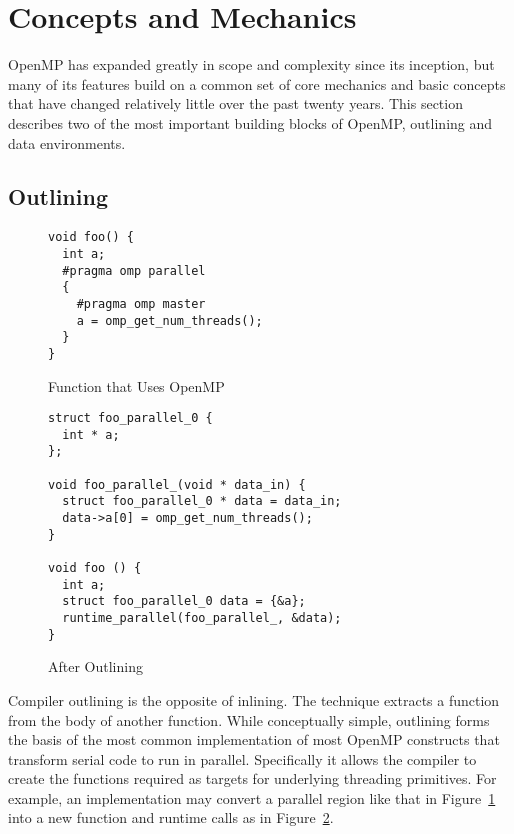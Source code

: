 \section{Concepts and Mechanics}
\label{sec:concepts}

OpenMP has expanded greatly in scope and complexity since its inception, but
many of its features build on a common set of core mechanics and basic concepts
that have changed relatively little over the past twenty years.  This section
describes two of the most important building blocks of OpenMP, outlining and
data environments.

\subsection{Outlining}
\label{sub:outlining}

\begin{figure}
\begin{verbatim}
void foo() {
  int a;
  #pragma omp parallel
  {
    #pragma omp master
    a = omp_get_num_threads();
  }
}
\end{verbatim}
\caption{Function that Uses OpenMP\label{fig:outline-before}}
\end{figure}

\begin{figure}
\begin{verbatim}
struct foo_parallel_0 {
  int * a;
};

void foo_parallel_(void * data_in) {
  struct foo_parallel_0 * data = data_in;
  data->a[0] = omp_get_num_threads();
}

void foo () {
  int a;
  struct foo_parallel_0 data = {&a};
  runtime_parallel(foo_parallel_, &data);
}
\end{verbatim}
\caption{After Outlining\label{fig:outline-after}}
\end{figure}

Compiler outlining is the opposite of inlining. The technique extracts a
function from the body of another function. While conceptually simple, 
outlining forms the basis of the most common implementation of most OpenMP 
constructs that transform serial code to run in parallel. Specifically it 
allows the compiler to create the functions required as targets for underlying
threading primitives. For example, an implementation may convert a parallel 
region like that in Figure~\ref{fig:outline-before} into a new function 
and runtime calls as in Figure~\ref{fig:outline-after}.

